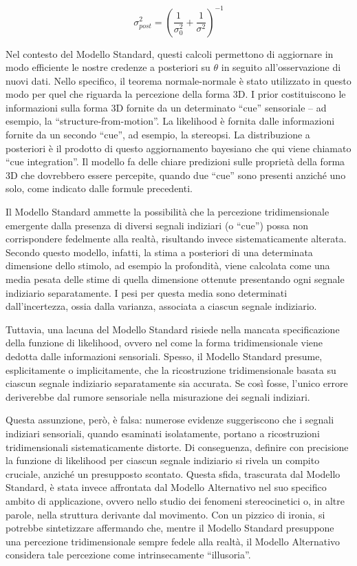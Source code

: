 \documentclass[
  man]{apa6}
\begin{document}
\[
\sigma_{post}^2 = \left(\frac{1}{\sigma_0^2} + \frac{1}{\sigma^2}\right)^{-1}
\]

Nel contesto del Modello Standard, questi calcoli permettono di aggiornare in modo efficiente le nostre credenze a posteriori su \(\theta\) in seguito all'osservazione di nuovi dati. Nello specifico, il teorema normale-normale è stato utilizzato in questo modo per quel che riguarda la percezione della forma 3D. I prior costituiscono le informazioni sulla forma 3D fornite da un determinato ``cue'' sensoriale -- ad esempio, la ``structure-from-motion''. La likelihood è fornita dalle informazioni fornite da un secondo ``cue'', ad esempio, la stereopsi. La distribuzione a posteriori è il prodotto di questo aggiornamento bayesiano che qui viene chiamato ``cue integration''. Il modello fa delle chiare predizioni sulle proprietà della forma 3D che dovrebbero essere percepite, quando due ``cue'' sono presenti anziché uno solo, come indicato dalle formule precedenti.

Il Modello Standard ammette la possibilità che la percezione tridimensionale emergente dalla presenza di diversi segnali indiziari (o ``cue'') possa non corrispondere fedelmente alla realtà, risultando invece sistematicamente alterata. Secondo questo modello, infatti, la stima a posteriori di una determinata dimensione dello stimolo, ad esempio la profondità, viene calcolata come una media pesata delle stime di quella dimensione ottenute presentando ogni segnale indiziario separatamente. I pesi per questa media sono determinati dall'incertezza, ossia dalla varianza, associata a ciascun segnale indiziario.

Tuttavia, una lacuna del Modello Standard risiede nella mancata specificazione della funzione di likelihood, ovvero nel come la forma tridimensionale viene dedotta dalle informazioni sensoriali. Spesso, il Modello Standard presume, esplicitamente o implicitamente, che la ricostruzione tridimensionale basata su ciascun segnale indiziario separatamente sia accurata. Se così fosse, l'unico errore deriverebbe dal rumore sensoriale nella misurazione dei segnali indiziari.

Questa assunzione, però, è falsa: numerose evidenze suggeriscono che i segnali indiziari sensoriali, quando esaminati isolatamente, portano a ricostruzioni tridimensionali sistematicamente distorte. Di conseguenza, definire con precisione la funzione di likelihood per ciascun segnale indiziario si rivela un compito cruciale, anziché un presupposto scontato. Questa sfida, trascurata dal Modello Standard, è stata invece affrontata dal Modello Alternativo nel suo specifico ambito di applicazione, ovvero nello studio dei fenomeni stereocinetici o, in altre parole, nella struttura derivante dal movimento. Con un pizzico di ironia, si potrebbe sintetizzare affermando che, mentre il Modello Standard presuppone una percezione tridimensionale sempre fedele alla realtà, il Modello Alternativo considera tale percezione come intrinsecamente ``illusoria''.
\end{document}
